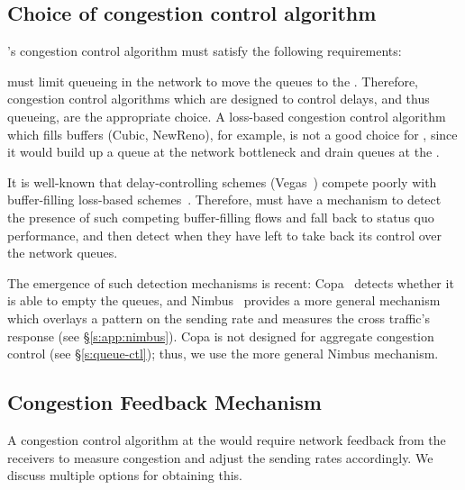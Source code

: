 
\subsection{Choice of congestion control algorithm}\label{s:design:whichcc}
\name's congestion control algorithm must satisfy the following requirements: 

 \name must limit queueing in the network to move the queues to the \inbox. Therefore, congestion control algorithms which are designed to control delays, and thus queueing, are the appropriate choice. 
A loss-based congestion control algorithm which fills buffers (\eg Cubic, NewReno), for example, is not a good choice for \name, since it would build up a queue at the network bottleneck and drain queues at the \inbox.

 It is well-known that delay-controlling schemes (\eg Vegas~\cite{vegas}) compete poorly with buffer-filling loss-based schemes~\cite{copa}.
Therefore, \name must have a mechanism to detect the presence of such competing buffer-filling flows and fall back to status quo performance, and then detect when they have left to take back its control over the network queues. 

The emergence of such detection mechanisms is recent: Copa~\cite{copa} detects whether it is able to empty the queues, and Nimbus~\cite{nimbus} provides a more general mechanism which overlays a pattern on the sending rate and measures the cross traffic's response  (see \S\ref{s:app:nimbus}).
Copa is not designed for aggregate congestion control (see \S\ref{s:queue-ctl}); thus, we use the more general Nimbus mechanism.

\subsection{Congestion Feedback Mechanism}\label{s:design:twosided}
A congestion control algorithm at the \inbox would require network feedback from the receivers to measure congestion and adjust the sending rates accordingly. We discuss multiple options for obtaining this. 

